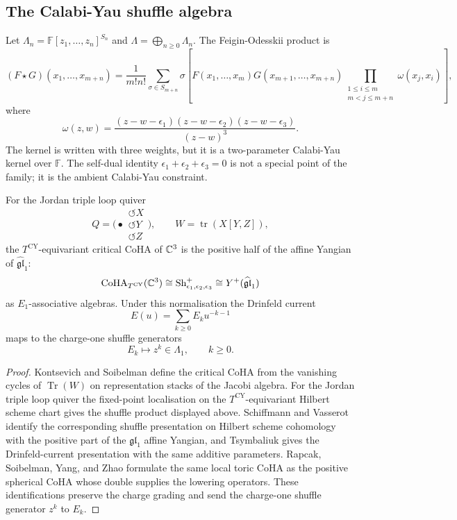 \subsection*{The Calabi-Yau shuffle algebra}

Let \(\Lambda_n=\mathbb F[z_1,\ldots,z_n]^{S_n}\) and
\(\Lambda=\bigoplus_{n\geq0}\Lambda_n\).  The Feigin-Odesskii product is
\[
(F\star G)(x_1,\ldots,x_{m+n})
 =
\frac{1}{m!n!}
\sum_{\sigma\in S_{m+n}}
\sigma\!\left[
F(x_1,\ldots,x_m)G(x_{m+1},\ldots,x_{m+n})
\prod_{\substack{1\leq i\leq m\\m<j\leq m+n}}
\omega(x_j,x_i)
\right],
\]
where
\[
  \omega(z,w)
  =
  \frac{(z-w-\epsilon_1)(z-w-\epsilon_2)(z-w-\epsilon_3)}
       {(z-w)^3}.
\]
The kernel is written with three weights, but it is a two-parameter
Calabi-Yau kernel over \(\mathbb F\).  The self-dual identity
\(\epsilon_1+\epsilon_2+\epsilon_3=0\) is not a special point of the
family; it is the ambient Calabi-Yau constraint.

\begin{theorem}
\label{thm:coha-c3-positive-half}
For the Jordan triple loop quiver
\[
Q=\bigl(\bullet \mathrel{\substack{\circlearrowleft X\\[-2pt]
\circlearrowleft Y\\[-2pt]\circlearrowleft Z}}\bigr),
\qquad
W=\operatorname{tr}(X[Y,Z]),
\]
the \(T^{\mathrm{CY}}\)-equivariant critical CoHA of \(\mathbb{C}^3\) is the
positive half of the affine Yangian of \(\widehat{\mathfrak{gl}}_1\):
\[
  \mathrm{CoHA}_{T^{\mathrm{CY}}}(\mathbb{C}^3)
  \cong
  \mathrm{Sh}^+_{\epsilon_1,\epsilon_2,\epsilon_3}
  \cong
  Y^{+}(\widehat{\mathfrak{gl}}_1)
\]
as \(E_1\)-associative algebras.  Under this normalisation the
Drinfeld current
\[
  E(u)=\sum_{k\geq0}E_k u^{-k-1}
\]
maps to the charge-one shuffle generators
\[
  E_k \longmapsto z^k\in \Lambda_1,\qquad k\geq0.
\]
\end{theorem}

\begin{proof}
Kontsevich and Soibelman define the critical CoHA from the vanishing
cycles of \(\operatorname{Tr}(W)\) on representation stacks of the
Jacobi algebra.  For the Jordan triple loop quiver the fixed-point
localisation on the \(T^{\mathrm{CY}}\)-equivariant Hilbert scheme
chart gives the shuffle product displayed above.  Schiffmann and
Vasserot identify the corresponding shuffle presentation on Hilbert
scheme cohomology with the positive part of the \(\mathfrak{gl}_1\)
affine Yangian, and Tsymbaliuk gives the Drinfeld-current
presentation with the same additive parameters.  Rapcak, Soibelman,
Yang, and Zhao formulate the same local toric CoHA as the positive
spherical CoHA whose double supplies the lowering operators.  These
identifications preserve the charge grading and send the charge-one
shuffle generator \(z^k\) to \(E_k\).
\end{proof}

